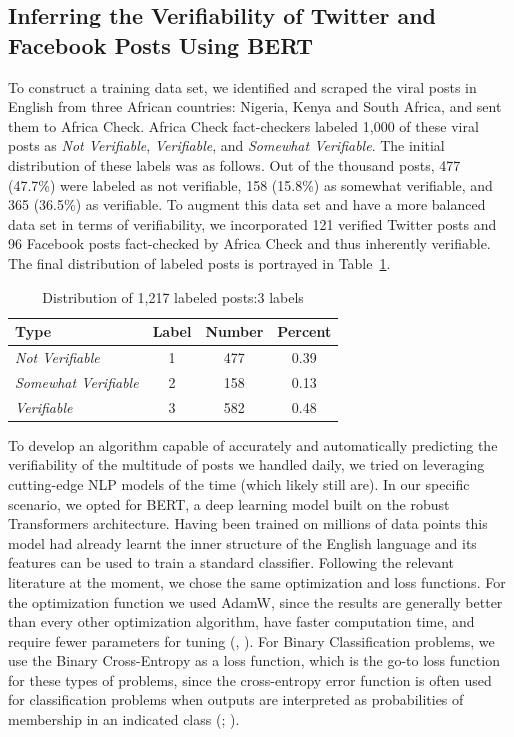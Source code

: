 
\newpage 

\subsection{Inferring the Verifiability of Twitter and Facebook Posts Using BERT}
\label{ver_bert}

To construct a training data set, we identified and scraped the viral posts in English from three African countries: Nigeria, Kenya and South Africa, and sent them to Africa Check. Africa Check fact-checkers labeled 1,000 of these viral posts as \textit{Not Verifiable}, \textit{Verifiable}, and \textit{Somewhat Verifiable}. The initial distribution of these labels was as follows. Out of the thousand posts, 477 (47.7\%) were labeled as not verifiable, 158 (15.8\%) as somewhat verifiable, and 365 (36.5\%) as verifiable. To augment this data set and have a more balanced data set in terms of verifiability, we incorporated 121 verified Twitter posts and 96 Facebook posts fact-checked by Africa Check and thus inherently verifiable. The final distribution of labeled posts is portrayed in Table~\ref{tab:ver1}. \\

\begin{table}[ht]
\centering
\caption{Distribution of 1,217 labeled posts:3 labels \label{tab:ver1}}
\begin{tabular}{lccc}\\
  \hline
Type & Label & Number & Percent  \\ 
  \hline
\textit{Not Verifiable} & 1 & 477 & 0.39  \\ 
\textit{Somewhat Verifiable} & 2 & 158 & 0.13  \\ 
\textit{Verifiable} & 3 & 582 & 0.48  \\ 
   \hline
\end{tabular}
\end{table}

To develop an algorithm capable of accurately and automatically predicting the verifiability of the multitude of posts we handled daily, we tried on leveraging cutting-edge NLP models of the time (which likely still are). In our specific scenario, we opted for BERT, a deep learning model built on the robust Transformers architecture. Having been trained on millions of data points this model had already learnt the inner structure of the English language and its features can be used to train a standard classifier. Following the relevant literature at the moment, we chose the same optimization and loss functions. For the optimization function we used AdamW, since the results are generally better than every other optimization algorithm, have faster computation time, and require fewer parameters for tuning (\cite{Kingma-2017}, \cite{Ruder-2016}). For Binary Classification problems, we use the Binary Cross-Entropy as a loss function, which is the go-to loss function for these types of problems, since the cross-entropy error function is often used for classification problems when outputs are interpreted as probabilities of membership in an indicated class (\cite{Reed}; \cite{Goodfellow-et-al-2016}). \\

